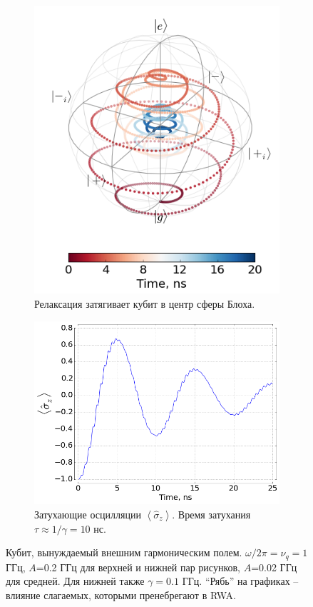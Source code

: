 \documentclass[12pt, twoside]{report}
\numberwithin{equation}{section}
\numberwithin{figure}{section}
\begin{document}
\begin{figure}[h!]
\vspace{1cm}
\begin{subfigure}[t]{0.4\textwidth}
\centering
\includegraphics[height=0.225\textheight]{Pictures/rabi_dynamics_bloch_rel}
\caption{Релаксация затягивает кубит в центр сферы Блоха.}
\end{subfigure}\quad
\begin{subfigure}[t]{0.5\textwidth}
\centering
\includegraphics[height=0.225\textheight]{Pictures/rabi_dynamics_sz_rel}
\caption{Затухающие осцилляции $\left< \hat\sigma_z \right>$. Время затухания $\tau\approx1/\gamma = 10$ нс.}
\end{subfigure}
\caption{Кубит, вынуждаемый внешним гармоническим полем. $\omega/2\pi = \nu_q = 1$ ГГц, $A$=0.2 ГГц для верхней и нижней пар рисунков, $A$=0.02 ГГц для средней. Для нижней также $\gamma = 0.1$ ГГц. ``Рябь'' на графиках -- влияние слагаемых, которыми пренебрегают в RWA.}
\label{fig:rabi_osc}
\end{figure}
\end{document}
